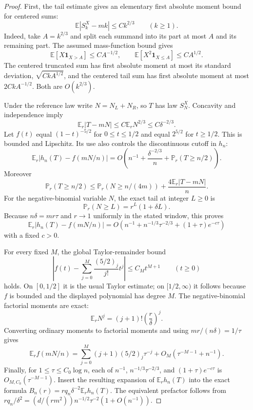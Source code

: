 \documentclass[11pt]{article}
\theoremstyle{remark}\newtheorem{remark}[theorem]{Remark}
\theoremstyle{definition}\newtheorem{definition}[theorem]{Definition}
\newcommand{\E}{\mathbb E}
\newcommand{\Prob}{\mathbb P}
\begin{document}
\begin{proof}
First, the tail estimate gives an elementary first absolute moment
bound for centered sums:
\[
\E|S_k^X-mk|\leq Ck^{2/3}\qquad(k\geq1).
\]
Indeed, take $A=k^{2/3}$ and split each summand into its part at most
$A$ and its remaining part. The assumed mass-function bound gives
\[
\E[X\mathbf1_{X>A}]\leq CA^{-1/2},\qquad
\E[X^2\mathbf1_{X\leq A}]\leq CA^{1/2}.
\]
The centered truncated sum has first absolute moment at most its
standard deviation, $\sqrt{CkA^{1/2}}$, and the centered tail sum
has first absolute moment at most $2CkA^{-1/2}$. Both are
$O(k^{2/3})$.

Under the reference law write $N=N_L+N_R$, so $T$ has law $S_N^X$.
Concavity and independence imply
\[
\E_r|T-mN|\leq C\E_rN^{2/3}
 \leq C\delta^{-2/3}.
\]
Let $f(t)$ equal $(1-t)^{-5/2}$ for $0\leq t\leq1/2$ and equal
$2^{5/2}$ for $t\geq1/2$. This is bounded and Lipschitz. Its use
also controls the discontinuous cutoff in $h_n$:
\[
\E_r|h_n(T)-f(mN/n)|
 =O\left(n^{-1}+\frac{\delta^{-2/3}}n
            +\Prob_r(T\geq n/2)\right).
\]
Moreover
\[
\Prob_r(T\geq n/2)
 \leq\Prob_r(N\geq n/(4m))
       +\frac{4\E_r|T-mN|}{n}.
\]
For the negative-binomial variable $N$, the exact tail at integer
$L\geq0$ is
\[
\Prob_r(N\geq L)=r^L(1+\delta L).
\]
Because $n\delta=mr\tau$ and $r\to1$ uniformly in the stated
window, this proves
\[
\E_r|h_n(T)-f(mN/n)|
 =O\left(n^{-1}+n^{-1/3}\tau^{-2/3}
                        +(1+\tau)e^{-c\tau}\right)
\]
with a fixed $c>0$.

For every fixed $M$, the global Taylor-remainder bound
\[
\left|f(t)-\sum_{j=0}^{M}\frac{(5/2)_j}{j!}t^j\right|
 \leq C_Mt^{M+1}\qquad(t\geq0)
\]
holds. On $[0,1/2]$ it is the usual Taylor estimate; on
$[1/2,\infty)$ it follows because $f$ is bounded and the displayed
polynomial has degree $M$. The negative-binomial factorial moments
are exact:
\[
\E_rN^{\underline j}=(j+1)!\left(\frac r\delta\right)^j.
\]
Converting ordinary moments to factorial moments and using
$mr/(n\delta)=1/\tau$ gives
\[
\E_rf(mN/n)
 =\sum_{j=0}^{M}(j+1)(5/2)_j\tau^{-j}
                  +O_M(\tau^{-M-1}+n^{-1}).
\]
Finally, for $1\leq\tau\leq C_0\log n$, each of
$n^{-1}$, $n^{-1/3}\tau^{-2/3}$, and
$(1+\tau)e^{-c\tau}$ is $O_{M,C_0}(\tau^{-M-1})$.
Insert the resulting expansion of $\E_rh_n(T)$ into the
exact formula $B_n(r)=rq_n\delta^{-2}\E_rh_n(T)$.
The equivalent prefactor follows from
$rq_n/\delta^2=(d/(rm^2))n^{-1/2}\tau^{-2}(1+O(n^{-1}))$.
\end{proof}
\end{document}
